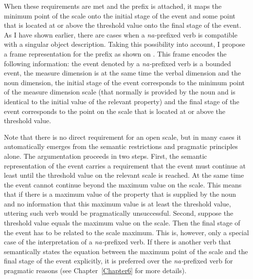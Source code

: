 When these requirements are met and the prefix is attached, it maps the minimum point of the scale onto the initial stage of the event and some point that is located at or above the threshold value onto the final stage of the event.  As I have shown earlier, there are cases when a \textit{na-}prefixed verb is compatible with a singular object description. Taking this possibility into account, I propose a frame representation for the prefix as shown on . This frame encodes the following information: the event denoted by a \textit{na-}prefixed verb is a bounded event, the measure dimension is at the same time the verbal dimension and the noun dimension, the initial stage of the event corresponds to the minimum point of the measure dimension scale (that normally is provided by the noun and is identical to the initial value of the relevant property) and the final stage of the event corresponds to the point on the scale that is located at or above the threshold value. 

Note that there is no direct requirement for an open scale, but in many cases it automatically emerges from the semantic restrictions and pragmatic principles alone. The argumentation proceeds in two steps. First, the semantic representation of the event carries a requirement that the event must continue at least until the threshold value on the relevant scale is reached. At the same time the event cannot continue beyond the maximum value on the scale. This means that if there is a maximum value of the property that is supplied by the noun and no information that this maximum value is at least the threshold value, uttering such verb would be pragmatically unsuccessful. Second, suppose the threshold value equals the maximum value on the scale. Then the final stage of the event has to be related to the scale maximum. This is, however, only a special case of the interpretation of a \textit{na-}prefixed verb. If there is another verb that semantically states the equation between the maximum point of the scale and the final stage of the event explicitly, it is preferred over the \textit{na-}prefixed verb for pragmatic reasons (see Chapter~\ref{Chapter6} for more details). 

